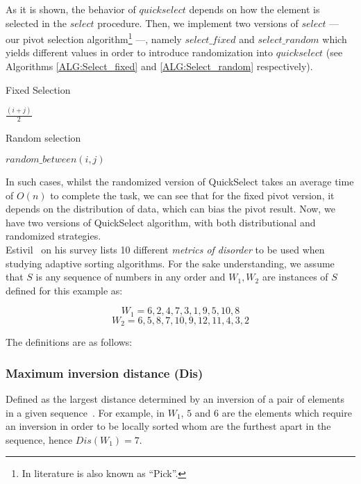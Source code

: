 As it is shown, the behavior of $quickselect$ depends on how the element is selected in the $select$ procedure. Then, we implement two versions of $select$ --- our pivot selection algorithm\footnote{In literature is also known as ``Pick''.} ---, namely $select\_fixed$ and $select\_random$ which yields different values in order to introduce randomization into $quickselect$ (see Algorithms \ref{ALG:Select_fixed} and \ref{ALG:Select_random} respectively).\\

\begin{algorithm}
  \caption{Fixed Selection}\label{ALG:Select_fixed}
  \begin{algorithmic}[1]
    \State \Return $\frac{(i+j)}{2}$
    \EndProcedure
  \end{algorithmic}
\end{algorithm}

\begin{algorithm}
  \caption{Random selection}\label{ALG:Select_random}
  \begin{algorithmic}[1]
    \State \Return $random\_between(i,j)$
    \EndProcedure
  \end{algorithmic}
\end{algorithm}

In such cases, whilst the randomized version of QuickSelect takes an average time of $O(n)$ to complete the task, we can see that for the fixed pivot version, it depends on the distribution of data, which can bias the pivot result. Now, we have two versions of QuickSelect algorithm, with both distributional and randomized strategies.\\

Estivil~\cite{estivil92} on his survey lists 10 different \textit{metrics of disorder} to be used when studying adaptive sorting algorithms. For the sake understanding, we assume that $S$ is any sequence of numbers in any order and $W_1,W_2$ are instances of $S$ defined for this example as: 

$$W_1 = {6,2,4,7,3,1,9,5,10,8}$$
$$W_2 = {6,5,8,7,10,9,12,11,4,3,2}$$

The definitions are as follows:

\subsubsection{Maximum inversion distance (Dis)}
Defined as the largest distance determined by an inversion of a pair of elements in a given sequence~\cite{Estivill-Castro_Wood_1989}.  For example, in $W_1$,  $5$ and $6$ are the elements which require an inversion in order to be locally sorted whom are the furthest apart in the sequence, hence $Dis(W_1) = 7$.\\

